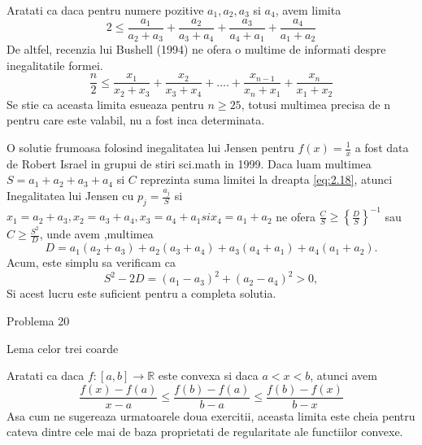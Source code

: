 \documentclass[a4paper,12pt,oneside]{report}
\begin{document}
Aratati ca daca pentru numere pozitive
 \(a_{1} , a_{2} , a_{3}\)  si \(  a_{4}\), avem limita
 \begin{displaymath}
     2\leq \frac{a_{1}}{a_{2} + a_{3}} + \frac{a_{2}}{a_{3} + a_{4}} + \frac{a_{3}}{a_{4} + a_{1}} + \frac{a_{4}}{a_{1} + a_{2}} \label{eq:2.20} \tag{2.20}
 \end{displaymath}
De altfel, recenzia lui Bushell (1994) ne ofera o multime de informati despre inegalitatile formei.
\begin{displaymath}
    \frac{n}{2} \leq \frac{x_{1}}{x_{2} + x_{3}} + \frac{x_{2}}{x_{3} + x_{4}} + ....+ \frac{x_{n - 1}}{x_{n} + x_{1}} + \frac{x_{n}}{x_{1} + x_{2}}
\end{displaymath}
Se stie ca aceasta limita esueaza pentru  \(n\geq 25\), totusi multimea precisa de n pentru care este valabil, nu a fost inca determinata. 

O solutie frumoasa folosind inegalitatea lui Jensen pentru \(f\left ( x \right ) = \frac{1}{x}\) a fost data de Robert Israel in grupui de stiri sci.math in 1999. Daca luam multimea \(S = a_{1} + a_{2} + a_{3} + a_{4}\) si \(C\) reprezinta suma limitei la dreapta \ref{eq:2.18}, atunci Inegalitatea lui Jensen cu \(p_{j} = \frac{a_{j}}{S}\) si \(x_{1} = a_{2} + a_{3}, x_{2} = a_{3} + a_{4} , x_{3} = a_{4} + a_{1} si x_{4} = a_{1} + a_{2}\) ne ofera \(\frac{C}{S} \geq \left \{ \frac{D}{S} \right \}^{-1}\) sau \(C \geq \frac{S^{2}}{D}\), unde avem ,multimea 
\begin{displaymath}
    D = a_{1}\left ( a_{2} + a_{3} \right ) + a_{2}\left ( a_{3} + a_{4} \right ) + a_{3}\left ( a_{4} + a_{1} \right ) + a_{4}\left ( a_{1} + a_{2} \right ).
\end{displaymath}
Acum, este simplu sa verificam ca 
\begin{displaymath}
    S^{2} - 2D = \left ( a_{1} - a_{3} \right )^{2} + \left ( a_{2} - a_{4} \right )^{2}> 0, 
\end{displaymath}
Si acest lucru este suficient pentru a completa solutia. 


Problema 20 
	
Lema celor trei coarde 

Aratati ca daca \(f : \left [ a,b \right ]  \to \mathbb{R}\) este convexa si daca \(a <  x < b\), atunci avem
\begin{displaymath}
    \frac{f\left ( x \right ) - f\left ( a \right )}{x - a} \leq \frac{f\left ( b \right ) - f\left ( a \right )}{b - a} \leq  \frac{f\left ( b \right ) - f\left ( x \right )}{b - x}   \label{eq:2.21}\tag{2.21}
\end{displaymath}
Asa cum ne sugereaza urmatoarele doua exercitii, aceasta limita este cheia pentru cateva dintre cele mai de baza proprietati de regularitate ale functiilor convexe. 
\end{document}
